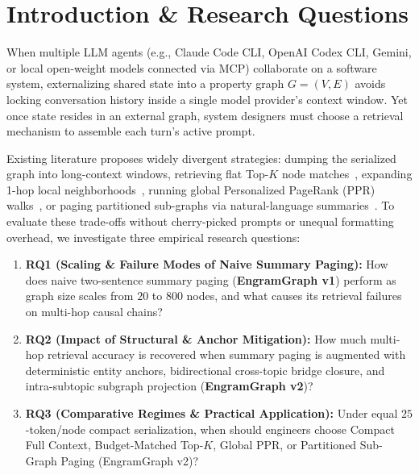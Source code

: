 \documentclass[10pt]{article}
\begin{document}
\section{Introduction \& Research Questions}
When multiple LLM agents (e.g., Claude Code CLI, OpenAI Codex CLI, Gemini, or local open-weight models connected via MCP) collaborate on a software system, externalizing shared state into a property graph $G=(V,E)$ avoids locking conversation history inside a single model provider's context window. Yet once state resides in an external graph, system designers must choose a retrieval mechanism to assemble each turn's active prompt.

Existing literature proposes widely divergent strategies: dumping the serialized graph into long-context windows, retrieving flat Top-$K$ node matches~\cite{chhikara2025mem0,anthropic2024mcp}, expanding 1-hop local neighborhoods~\cite{guo2024lightrag}, running global Personalized PageRank (PPR) walks~\cite{gutierrez2024hipporag}, or paging partitioned sub-graphs via natural-language summaries~\cite{packer2023memgpt,edge2024graphrag}. To evaluate these trade-offs without cherry-picked prompts or unequal formatting overhead, we investigate three empirical research questions:
\begin{enumerate}
  \setlength{\itemsep}{2pt}\setlength{\parskip}{0pt}
  \item \textbf{RQ1 (Scaling \& Failure Modes of Naive Summary Paging):} How does naive two-sentence summary paging (\textbf{EngramGraph v1}) perform as graph size scales from $20$ to $800$ nodes, and what causes its retrieval failures on multi-hop causal chains?
  \item \textbf{RQ2 (Impact of Structural \& Anchor Mitigation):} How much multi-hop retrieval accuracy is recovered when summary paging is augmented with deterministic entity anchors, bidirectional cross-topic bridge closure, and intra-subtopic subgraph projection (\textbf{EngramGraph v2})?
  \item \textbf{RQ3 (Comparative Regimes \& Practical Application):} Under equal $25$-token/node compact serialization, when should engineers choose Compact Full Context, Budget-Matched Top-$K$, Global PPR, or Partitioned Sub-Graph Paging (EngramGraph v2)?
\end{enumerate}

\end{document}
